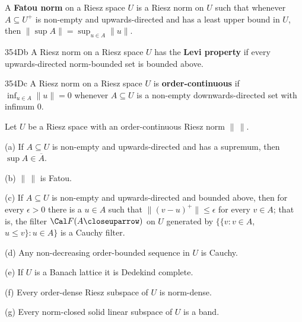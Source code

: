 A {\bf Fatou norm} on a Riesz space $U$
is a Riesz norm on $U$ such that whenever $A\subseteq U^+$ is non-empty
and upwards-directed and has a least upper bound in $U$, then
$\|\sup A\|=\sup_{u\in A}\|u\|$.   

\spheader 354Db A Riesz norm on a Riesz space $U$ has the {\bf Levi
property} if every upwards-directed norm-bounded set is bounded above.

\spheader 354Dc A Riesz norm on a Riesz space $U$ is
{\bf order-continuous} if $\inf_{u\in A}\|u\|=0$ whenever $A\subseteq U$
is a non-empty downwards-directed set with infimum $0$.

 Let $U$ be a Riesz space with an
order-continuous Riesz norm $\|\,\|$.

(a) If $A\subseteq U$ is non-empty and upwards-directed and has a
supremum, then $\sup A\in\overline{A}$.

(b) $\|\,\|$ is Fatou.

(c) If $A\subseteq U$ is non-empty and upwards-directed and bounded
above, then for every $\epsilon>0$ there is a $u\in A$ such that
$\|(v-u)^+\|\le\epsilon$ for every $v\in A$;
that is, the filter $\Cal F(A\closeuparrow)$ on $U$ generated by
$\{\{v:v\in A$, $u\le v\}:u\in A\}$ is a Cauchy filter.

(d) Any non-decreasing order-bounded sequence in $U$ is Cauchy.

(e) If $U$ is a Banach lattice it is Dedekind complete.

(f) Every order-dense Riesz subspace of $U$ is norm-dense.

(g) Every norm-closed solid linear subspace of $U$ is a band.

